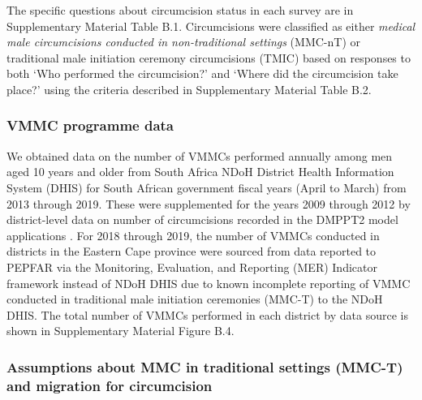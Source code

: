 \documentclass{article}
\begin{document}
The specific questions about circumcision status in each survey are in Supplementary Material Table B.1. Circumcisions were classified as either \textit{medical male circumcisions conducted in non-traditional settings} (MMC-nT) or traditional male initiation ceremony circumcisions (TMIC) based on responses to both `Who performed the circumcision?' and `Where did the circumcision take place?' using the criteria described in Supplementary Material Table B.2.


\subsubsection*{VMMC programme data}


We obtained data on the number of VMMCs performed annually among men aged 10 years and older from South Africa NDoH District Health Information System (DHIS) for South African government fiscal years (April to March) from 2013 through 2019. These were supplemented for the years 2009 through 2012 by district-level data on number of circumcisions recorded in the DMPPT2 model applications \cite{kripke2016age, kripke2016cost}. For 2018 through 2019, the number of VMMCs conducted in districts in the Eastern Cape province were sourced from data reported to PEPFAR via the Monitoring, Evaluation, and Reporting (MER) Indicator framework instead of NDoH DHIS due to known incomplete reporting of VMMC conducted in traditional male initiation ceremonies (MMC-T) to the NDoH DHIS. The total number of VMMCs performed in each district by data source is shown in Supplementary Material Figure B.4.


\subsubsection*{Assumptions about MMC in traditional settings (MMC-T) and migration for circumcision}

\end{document}

